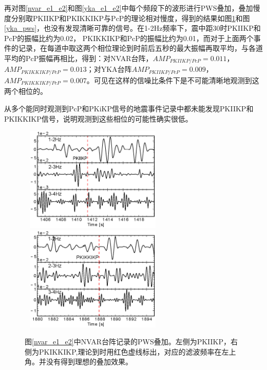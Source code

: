 再对图\ref{nvar_e1_e2}和图\ref{yka_e1_e2}中每个频段下的波形进行PWS叠加，叠加慢度分别取PKIIKP和PKIKKIKP与PcP的理论相对慢度，得到的结果如图\ref{nvar_pws}和图\ref{yka_pws}，也没有发现清晰可靠的信号。在1-2Hz频率下，震中距30{\textdegree}时PKIIKP和PcP的振幅比约为0.02，%
PKIKKIKP和PcP的振幅比约为0.01，而对于上面两个事件的记录，在每道中取这两个相位理论到时前后五秒的最大振幅再取平均，与各道平均的PcP振幅再相比，得到：对NVAR台阵，$AMP_{PKIIKP/PcP}=0.011$，%
$AMP_{PKIKKIKP/PcP}=0.013$；对YKA台阵$AMP_{PKIIKP/PcP}=0.009$，%
$AMP_{PKIKKIKP/PcP}=0.007$。可见在这样的信噪比条件下是不可能清晰地观测到这两个相位的。

从多个能同时观测到PcP和PKiKP信号的地震事件记录中都未能发现PKIIKP和PKIKKIKP信号，说明观测到这些相位的可能性确实很低。

\begin{figure}[!ht]
	\centering
	\includegraphics[width=7cm,height=5cm]{fig/chap3/nvar_e1_pws.eps}
	\hspace{1em}
	\includegraphics[width=7cm,height=5cm]{fig/chap3/nvar_e2_pws.eps}
	\caption{图\ref{nvar_e1_e2}中NVAR台阵记录的PWS叠加。左侧为PKIIKP，右侧为PKIKKIKP,理论到时用红色虚线标出，对应的滤波频率在左上角。并没有得到理想的叠加效果。}
	\label{nvar_pws}
\end{figure}

